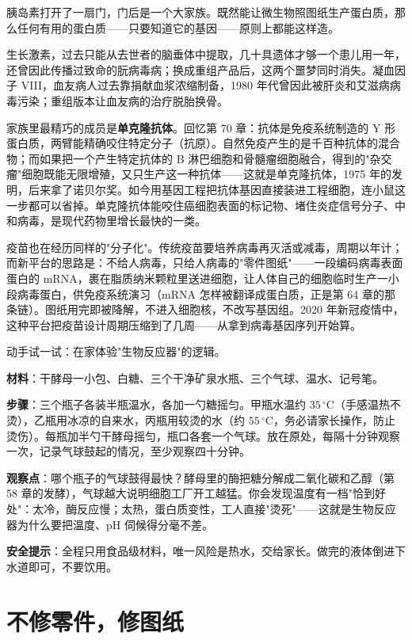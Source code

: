 胰岛素打开了一扇门，门后是一个大家族。既然能让微生物照图纸生产蛋白质，那么任何有用的蛋白质——只要知道它的基因——原则上都能这样造。

生长激素，过去只能从去世者的脑垂体中提取，几十具遗体才够一个患儿用一年，还曾因此传播过致命的朊病毒病；换成重组产品后，这两个噩梦同时消失。凝血因子 VIII，血友病人过去靠捐献血浆浓缩制备，1980 年代曾因此被肝炎和艾滋病病毒污染；重组版本让血友病的治疗脱胎换骨。

家族里最精巧的成员是\textbf{单克隆抗体}。回忆第 70 章：抗体是免疫系统制造的 Y 形蛋白质，两臂能精确咬住特定分子（抗原）。自然免疫产生的是千百种抗体的混合物；而如果把一个产生特定抗体的 B 淋巴细胞和骨髓瘤细胞融合，得到的"杂交瘤"细胞既能无限增殖，又只生产这一种抗体——这就是单克隆抗体，1975 年的发明，后来拿了诺贝尔奖。如今用基因工程把抗体基因直接装进工程细胞，连小鼠这一步都可以省掉。单克隆抗体能咬住癌细胞表面的标记物、堵住炎症信号分子、中和病毒，是现代药物里增长最快的一类。

疫苗也在经历同样的"分子化"。传统疫苗要培养病毒再灭活或减毒，周期以年计；而新平台的思路是：不给人病毒，只给人病毒的"零件图纸"——一段编码病毒表面蛋白的 mRNA，裹在脂质纳米颗粒里送进细胞，让人体自己的细胞临时生产一小段病毒蛋白，供免疫系统演习（mRNA 怎样被翻译成蛋白质，正是第 64 章的那条链）。图纸用完即被降解，不进入细胞核，不改写基因组。2020 年新冠疫情中，这种平台把疫苗设计周期压缩到了几周——从拿到病毒基因序列开始算。

\begin{shiyan}
动手试一试：在家体验"生物反应器"的逻辑。

\textbf{材料}：干酵母一小包、白糖、三个干净矿泉水瓶、三个气球、温水、记号笔。

\textbf{步骤}：三个瓶子各装半瓶温水，各加一勺糖摇匀。甲瓶水温约 $35\,^{\circ}\mathrm{C}$（手感温热不烫），乙瓶用冰凉的自来水，丙瓶用较烫的水（约 $55\,^{\circ}\mathrm{C}$，务必请家长操作，防止烫伤）。每瓶加半勺干酵母摇匀，瓶口各套一个气球。放在原处，每隔十分钟观察一次，记录气球鼓起的情况，至少观察四十分钟。

\textbf{观察点}：哪个瓶子的气球鼓得最快？酵母里的酶把糖分解成二氧化碳和乙醇（第 58 章的发酵），气球越大说明细胞工厂开工越猛。你会发现温度有一档"恰到好处"：太冷，酶反应慢；太热，蛋白质变性，工人直接"烫死"——这就是生物反应器为什么要把温度、pH 伺候得分毫不差。

\textbf{安全提示}：全程只用食品级材料，唯一风险是热水，交给家长。做完的液体倒进下水道即可，不要饮用。
\end{shiyan}

\section{不修零件，修图纸}


